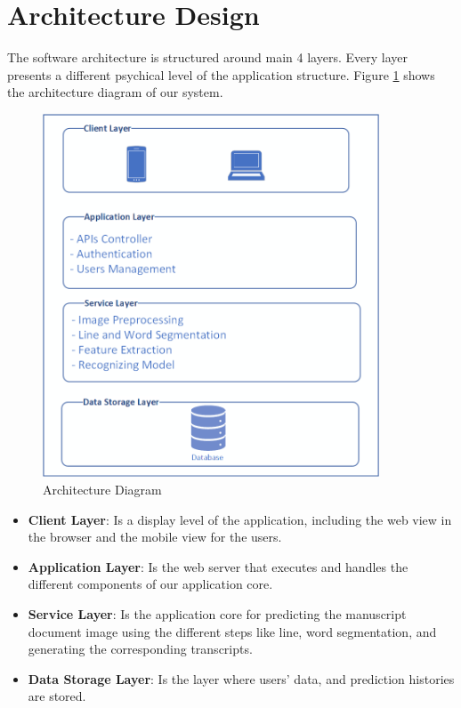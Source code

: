 \clearpage

\section{Architecture Design}
The software architecture is structured around main 4 layers. Every layer presents a different psychical level of the application structure. Figure \ref{fig:architecture-diagram} shows the architecture diagram of our system.

\begin{figure}[!htb]
    \centering
    \includegraphics[width=10cm]{images/architecture layers.png}
    \caption{Architecture Diagram}
    \label{fig:architecture-diagram}
\end{figure}

\begin{itemize}[itemsep=1pt, topsep=5pt]
    \item   \textbf{Client Layer}: Is a display level of the application, including the web view in the browser and the mobile view for the users.
    \item   \textbf{Application Layer}: Is the web server that executes and handles the different components of our application core. 
    \item   \textbf{Service Layer}: Is the application core for predicting the manuscript document image using the different steps like line, word segmentation, and generating the corresponding transcripts.
    \item   \textbf{Data Storage Layer}: Is the layer where users' data, and prediction histories are stored. 
\end{itemize}
